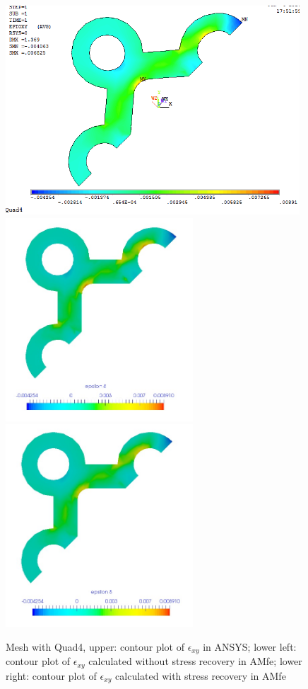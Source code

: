 \begin{figure}[htbp]
	\begin{center}
		\includegraphics[width=11cm,clip]{Quad4_Exy.png} 	
		\includegraphics[width=7cm,clip]{Quad4_Exy_PD.png} 		
		\includegraphics[width=7cm,clip]{Quad4_Exy_P.png} 		
		\caption{Mesh with Quad4, upper: contour plot of $\epsilon_{xy}$ in ANSYS; lower left: contour plot of $\epsilon_{xy}$ calculated without stress recovery in AMfe; lower right: contour plot of $\epsilon_{xy}$ calculated with stress recovery in AMfe} \label{fig: Quad4_Exy}
	\end{center}
\end{figure}
\clearpage 

